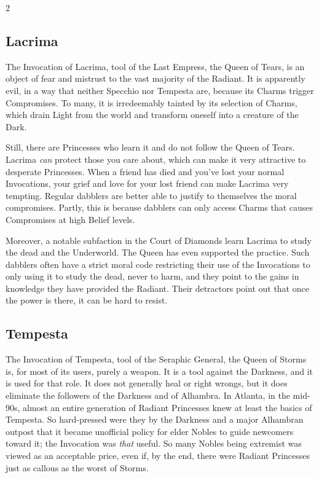 \begin{multicols}{2}
\subsection*{Lacrima}
The Invocation of Lacrima, tool of the Last Empress, the Queen of Tears, is an object of fear and mistrust to the vast majority of the Radiant. It is apparently evil, in a way that neither Specchio nor Tempesta are, because its Charms trigger Compromises. To many, it is irredeemably tainted by its selection of Charms, which drain Light from the world and transform oneself into a creature of the Dark. 

Still, there are Princesses who learn it and do not follow the Queen of Tears. Lacrima \textit{can} protect those you care about, which can make it very attractive to desperate Princesses. When a friend has died and you've lost your normal Invocations, your grief and love for your lost friend can make Lacrima very tempting. Regular dabblers are better able to justify to themselves the moral compromises. Partly, this is because dabblers can only access Charms that causes Compromises at high Belief levels. 

Moreover, a notable subfaction in the Court of Diamonds learn Lacrima to study the dead and the Underworld. The Queen has even supported the practice. Such dabblers often have a strict moral code restricting their use of the Invocations to only using it to study the dead, never to harm, and they point to the gains in knowledge they have provided the Radiant. Their detractors point out that once the power is there, it can be hard to resist. 

\subsection*{Tempesta} 
The Invocation of Tempesta, tool of the Seraphic General, the Queen of Storms is, for most of its users, purely a weapon. It is a tool against the Darkness, and it is used for that role. It does not generally heal or right wrongs, but it does eliminate the followers of the Darkness and of Alhambra. In Atlanta, in the mid-90s, almost an entire generation of Radiant Princesses knew at least the basics of Tempesta. So hard-pressed were they by the Darkness and a major Alhambran outpost that it became unofficial policy for elder Nobles to guide newcomers toward it; the Invocation was \textit{that} useful. So many Nobles being extremist was viewed as an acceptable price, even if, by the end, there were Radiant Princesses just as callous as the worst of Storms.


\end{multicols}
